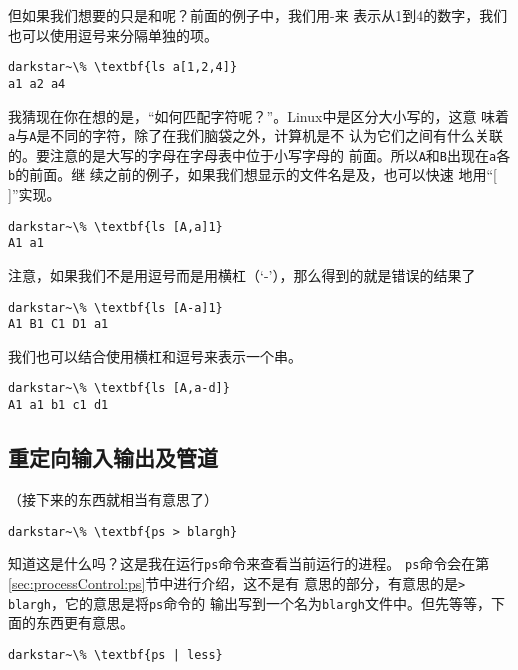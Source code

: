 但如果我们想要的只是和呢？前面的例子中，我们用-来
表示从1到4的数字，我们也可以使用逗号来分隔单独的项。
\begin{Verbatim}[frame=single, commandchars=\\\{\}]
darkstar~\% \textbf{ls a[1,2,4]}
a1 a2 a4
\end{Verbatim}

我猜现在你在想的是，``如何匹配字符呢？''。Linux中是区分大小写的，这意
味着\texttt{a}与\texttt{A}是不同的字符，除了在我们脑袋之外，计算机是不
认为它们之间有什么关联的。要注意的是大写的字母在字母表中位于小写字母的
前面。所以\texttt{A}和\texttt{B}出现在\texttt{a}各\texttt{b}的前面。继
续之前的例子，如果我们想显示的文件名是及，也可以快速
地用``[ ]''实现。
\begin{Verbatim}[frame=single, commandchars=\\\{\}]
darkstar~\% \textbf{ls [A,a]1}
A1 a1
\end{Verbatim}

注意，如果我们不是用逗号而是用横杠（`-'），那么得到的就是错误的结果了

\begin{Verbatim}[frame=single, commandchars=\\\{\}]
darkstar~\% \textbf{ls [A-a]1}
A1 B1 C1 D1 a1
\end{Verbatim}

我们也可以结合使用横杠和逗号来表示一个串。

\begin{Verbatim}[frame=single, commandchars=\\\{\}]
darkstar~\% \textbf{ls [A,a-d]}
A1 a1 b1 c1 d1
\end{Verbatim}


\subsection{重定向输入输出及管道}
\label{sec:shell:commandLine:redirectionAndPiping}
（接下来的东西就相当有意思了）
\begin{Verbatim}[frame=single, commandchars=\\\{\}]
darkstar~\% \textbf{ps > blargh}
\end{Verbatim}

知道这是什么吗？这是我在运行\texttt{ps}命令来查看当前运行的进程。
\texttt{ps}命令会在第\ref{sec:processControl:ps}节中进行介绍，这不是有
意思的部分，有意思的是\texttt{> blargh}，它的意思是将\texttt{ps}命令的
输出写到一个名为\texttt{blargh}文件中。但先等等，下面的东西更有意思。
\begin{Verbatim}[frame=single, commandchars=\\\{\}]
darkstar~\% \textbf{ps | less}
\end{Verbatim}

